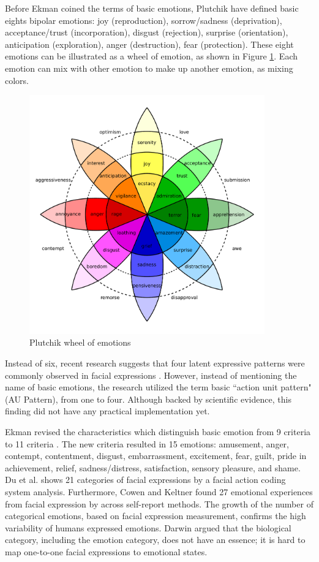 Before Ekman coined the terms of basic emotions, Plutchik
\cite{plutchik1980emotion} have defined basic eights bipolar emotions: joy
(reproduction), sorrow/sadness (deprivation), acceptance/trust (incorporation),
disgust (rejection), surprise (orientation), anticipation (exploration), anger
(destruction), fear (protection). These eight emotions can be illustrated as a
wheel of emotion, as shown in Figure \ref{fig:plutchik_model}. Each emotion can
mix with other emotion to make up another emotion, as mixing colors. 

\begin{figure}[htbp]
    \centering
    \includegraphics[width=4in]{../fig/plutchik_model.pdf}
    \caption{Plutchik wheel of emotions}
    \label{fig:plutchik_model}
\end{figure}

Instead of six, recent research suggests that four latent expressive patterns
were commonly observed in facial expressions \cite{Jack2016}. However, instead
of mentioning the name of basic emotions, the research utilized the term basic
``action unit pattern" (AU Pattern), from one to four. Although backed by
scientific evidence, this finding did not have any practical implementation
yet.

Ekman revised the characteristics which distinguish basic emotion from 9
criteria \cite{Ekman1992} to 11 criteria \cite{Ekman2005}. The new criteria
resulted in 15 emotions: amusement, anger, contempt, contentment, disgust,
embarrassment, excitement, fear, guilt, pride in achievement, relief,
sadness/distress, satisfaction, sensory pleasure, and shame. Du et al. 
\cite{Du2014} shows 21 categories of facial expressions by a facial action
coding system analysis. Furthermore, Cowen and Keltner \cite{Cowen2017} found
27 emotional experiences from facial expression by across self-report methods.
The growth of the number of categorical emotions, based on facial expression
measurement, confirms the high variability of humans expressed emotions. Darwin
argued that the biological category, including the emotion category, does not
have an essence; it is hard to map one-to-one facial expressions to emotional
states.


